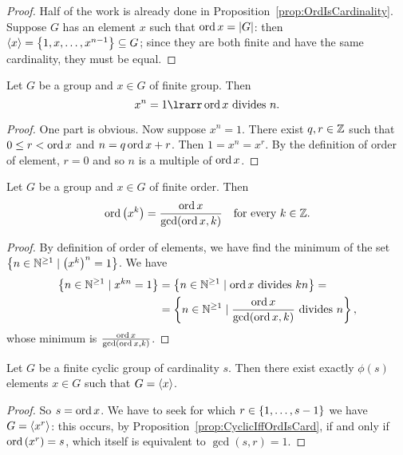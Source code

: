\begin{proof}
Half of the work is already done in Proposition~\ref{prop:OrdIsCardinality}. Suppose \(G\) has an element \(x\) such that \(\operatorname{ord} x = \lvert G \rvert\): then \(\left\langle x\right\rangle = \left\{1, x, \dots{}, x^{n-1}\right\} \subseteq G\); since they are both finite and have the same cardinality, they must be equal.
\end{proof}

\begin{proposition}\label{prop:OrdDividesN}
Let \(G\) be a group and \(x \in G\) of finite group. Then
\[x^n = 1 \lrarr \ord x \text{ divides } n.\]
\end{proposition}

\begin{proof}
One part is obvious. Now suppose \(x^n = 1\). There exist \(q, r \in \mathbb Z\) such that \(0 \le r < \operatorname{ord} x\) and \(n = q \operatorname{ord} x +r\). Then \(1 = x^n = x^r\). By the definition of order of element, \(r = 0\) and so \(n\) is a multiple of \(\operatorname{ord} x\).
\end{proof}

\begin{proposition}
Let \(G\) be a group and \(x \in G\) of finite order. Then
\[\operatorname{ord}\left(x^k\right) = \frac{\operatorname{ord} x}{\gcd(\operatorname{ord} x, k)} \quad \text{for every } k \in \mathbb Z.\]
\end{proposition}

\begin{proof} By definition of order of elements, we have find the minimum of the set \(\left\{n \in \mathbb N^{\ge 1} \mid \left(x^k\right)^n = 1\right\}\). We have 
\begin{align*}
\left\{ n \in \mathbb N^{\ge 1} \mid x^{kn} = 1\right\} & = \left\{n \in \mathbb N^{\ge 1} \mid \operatorname{ord} x \text{ divides } kn\right\} = \\
& = \left\{n \in \mathbb N^{\ge 1} \mid \frac{\operatorname{ord} x}{\gcd(\operatorname{ord} x, k)} \text{ divides } n\right\},
\end{align*}
whose minimum is \(\frac{\operatorname{ord} x}{\gcd(\operatorname{ord} x, k)}\).
\end{proof}

\begin{corollary}
Let \(G\) be a finite cyclic group of cardinality \(s\). Then there exist exactly \(\phi(s)\) elements \(x \in G\) such that \(G = \left\langle x\right\rangle\).
\end{corollary}

\begin{proof}
So \(s = \operatorname{ord} x\). We have to seek for which \(r \in \left\{1, \dots{}, s-1\right\}\) we have \(G = \left\langle x^r\right\rangle\): this occurs, by Proposition~\ref{prop:CyclicIffOrdIsCard}, if and only if \(\operatorname{ord} \left(x^r\right) = s\), which itself is equivalent to \(\gcd(s, r) = 1\).
\end{proof}

